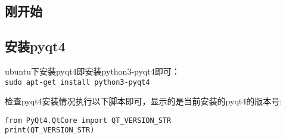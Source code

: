 \documentclass[12pt,oneside]{book}
\begin{document}
\begin{common-format}
\mainmatter

\chapter{刚开始}

\section{安装pyqt4}
ubuntu下安装pyqt4即安装python3-pyqt4即可：\\
\verb+sudo apt-get install python3-pyqt4+

检查pyqt4安装情况执行以下脚本即可，显示的是当前安装的pyqt4的版本号:
\begin{Verbatim}
from PyQt4.QtCore import QT_VERSION_STR
print(QT_VERSION_STR)
\end{Verbatim}


\end{common-format}
\end{document}
